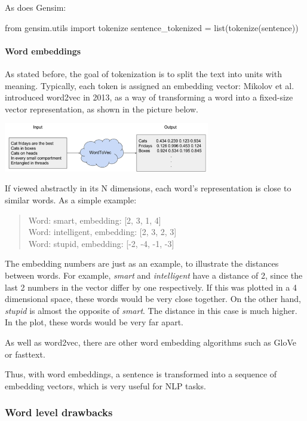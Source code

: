As does Gensim:

\begin{python}
from gensim.utils import tokenize
sentence_tokenized = list(tokenize(sentence))
\end{python}

\paragraph{Word embeddings}\label{subsec:wordemb}

As stated before, the goal of tokenization is to split the text into units with meaning. Typically, each token is assigned an embedding vector: Mikolov et al. \cite{mikolov2013efficient} introduced word2vec in 2013, as a way of transforming a word into a fixed-size vector representation, as shown in the picture below.

\includegraphics[width=9cm]{figures/word_emb.png}

If viewed abstractly in its N dimensions, each word's representation is close to similar words. As a simple example:

\begin{quote}
    Word: smart, embedding: [2, 3, 1, 4]\\
    Word: intelligent, embedding: [2, 3, 2, 3]\\
    Word: stupid, embedding: [-2, -4, -1, -3]
\end{quote}

The embedding numbers are just as an example, to illustrate the distances between words. For example, \emph{smart} and \emph{intelligent} have a distance of 2, since the last 2 numbers in the vector differ by one respectively. If this was plotted in a 4 dimensional space, these words would be very close together. On the other hand, \emph{stupid} is almost the opposite of \emph{smart}. The distance in this case is much higher. In the plot, these words would be very far apart.

As well as word2vec, there are other word embedding algorithms such as GloVe or fasttext.

Thus, with word embeddings, a sentence is transformed into a sequence of embedding vectors, which is very useful for NLP tasks.

\subsubsection{Word level drawbacks}

